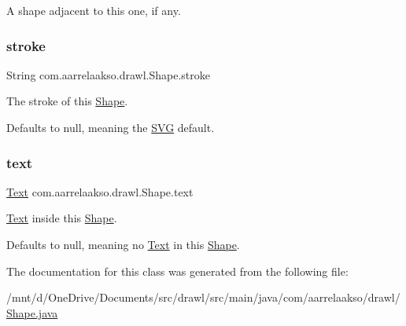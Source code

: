 A shape adjacent to this one, if any. 

\mbox{\label{classcom_1_1aarrelaakso_1_1drawl_1_1_shape_a7889c6cd8d073a3adad5ce6bcf8247a3}} 
\subsubsection{\texorpdfstring{stroke}{stroke}}
{\footnotesize\ttfamily String com.\+aarrelaakso.\+drawl.\+Shape.\+stroke\hspace{0.3cm}{\ttfamily [private]}}



The stroke of this \hyperlink{classcom_1_1aarrelaakso_1_1drawl_1_1_shape}{Shape}. 

Defaults to null, meaning the \hyperlink{classcom_1_1aarrelaakso_1_1drawl_1_1_s_v_g}{S\+VG} default. \mbox{\label{classcom_1_1aarrelaakso_1_1drawl_1_1_shape_ab54afc2d95d3447532f5ecf3fec3faa8}} 
\subsubsection{\texorpdfstring{text}{text}}
{\footnotesize\ttfamily \hyperlink{classcom_1_1aarrelaakso_1_1drawl_1_1_text}{Text} com.\+aarrelaakso.\+drawl.\+Shape.\+text\hspace{0.3cm}{\ttfamily [private]}}



\hyperlink{classcom_1_1aarrelaakso_1_1drawl_1_1_text}{Text} inside this \hyperlink{classcom_1_1aarrelaakso_1_1drawl_1_1_shape}{Shape}. 

Defaults to null, meaning no \hyperlink{classcom_1_1aarrelaakso_1_1drawl_1_1_text}{Text} in this \hyperlink{classcom_1_1aarrelaakso_1_1drawl_1_1_shape}{Shape}. 

The documentation for this class was generated from the following file\+:\begin{DoxyCompactItemize}
\item 
/mnt/d/\+One\+Drive/\+Documents/src/drawl/src/main/java/com/aarrelaakso/drawl/\hyperlink{_shape_8java}{Shape.\+java}\end{DoxyCompactItemize}
